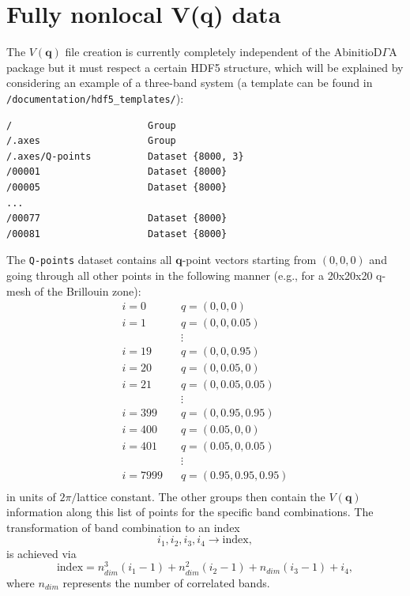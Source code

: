 \documentclass[a4paper,11pt]{article}
\numberwithin{equation}{section} %
\begin{document}
\newpage
\section{Fully nonlocal V(q) data}
The $V(\mathbf{q})$ file creation is currently completely independent of the AbinitioD$\Gamma$A package but it must respect a certain HDF5 structure,
which will be explained by considering an example of a three-band system (a template can be found in {\color{blue}\verb+/documentation/hdf5_templates/+}):
\begin{lstlisting}[caption=$V(q)$ file structure, frame=single,
basicstyle=\small]
/                        Group
/.axes                   Group
/.axes/Q-points          Dataset {8000, 3}
/00001                   Dataset {8000}
/00005                   Dataset {8000}
...
/00077                   Dataset {8000}
/00081                   Dataset {8000}
\end{lstlisting}
The \verb|Q-points| dataset contains all $\mathbf{q}$-point vectors starting from $(0,0,0)$ and going through all other points in the following manner (e.g., for a 20x20x20 q-mesh of the Brillouin zone):
\begin{equation*}
\begin{aligned}
i = 0\;\;\;& q = (0,0,0)\\
i = 1\;\;\;& q = (0,0,0.05)\\
&\vdots \\
i = 19\;\;\;& q = (0,0,0.95)\\
i = 20\;\;\;& q = (0,0.05,0)\\
i = 21\;\;\;& q = (0,0.05,0.05)\\
&\vdots \\
i = 399\;\;\;& q = (0,0.95,0.95)\\
i = 400\;\;\;& q = (0.05,0,0)\\
i = 401\;\;\;& q = (0.05,0,0.05)\\
&\vdots \\
i = 7999\;\;\;& q = (0.95,0.95,0.95)\\
\end{aligned}
\end{equation*}
in units of $2\pi/$lattice constant.
The other groups then contain the $V(\mathbf{q})$ information along this list of points for the specific band combinations. The transformation of band combination to an index
\begin{equation*}
i_1,i_2,i_3,i_4 \rightarrow \mathrm{index},
\end{equation*}
is achieved via
\begin{equation*}
\mathrm{index} = n_{dim}^3(i_1-1) + n_{dim}^2(i_2-1) + n_{dim}(i_3-1) + i_4,
\end{equation*}
where $n_{dim}$ represents the number of correlated bands.
\end{document}
